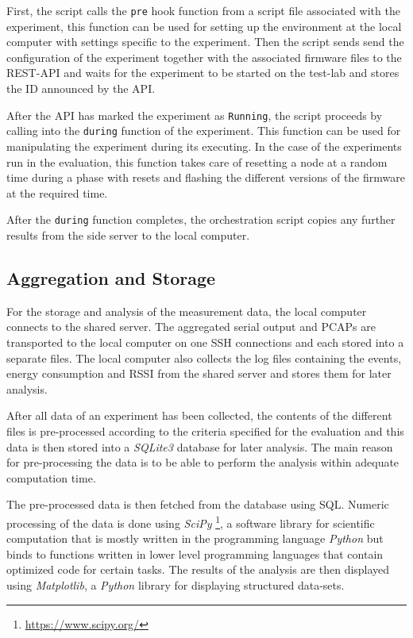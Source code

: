 First, the script calls the \texttt{pre} hook function from a script file
associated with the experiment, this function can be used for setting up the
environment at the local computer with settings specific to the experiment. Then
the script sends send the configuration of the experiment together with the
associated firmware files to the \ac{REST}-\ac{API} and waits for the experiment
to be started on the test-lab and stores the ID announced by the \ac{API}.

After the \ac{API} has marked the experiment as \texttt{Running}, the script
proceeds by calling into the \texttt{during} function of the experiment. This
function can be used for manipulating the experiment during its executing. In
the case of the experiments run in the evaluation, this function takes care of
resetting a node at a random time during a phase with resets and flashing the different versions of the firmware at the
required time.

After the \texttt{during} function completes, the orchestration script copies
any further results from the side server to the local computer.

\subsection{Aggregation and Storage}

For the storage and analysis of the measurement data, the local computer connects
to the shared server. The aggregated serial output and \acp{PCAP} are
transported to the local computer on one \ac{SSH} connections and each stored
into a separate files. The local computer also collects the log files containing
the events, energy consumption and \ac{RSSI} from the shared server and stores them for
later analysis.

After all data of an experiment has been collected, the contents of the
different files is pre-processed according to the criteria specified for the
evaluation and this data is then stored into a
\emph{SQLite3} database for later analysis. The main reason for pre-processing
the data is to be able to perform the analysis within adequate computation time.

The pre-processed data is then fetched from the database using \ac{SQL}. Numeric
processing of the data is done using \emph{SciPy}
\footnote{\url{https://www.scipy.org/}}, a software library for scientific
computation that is mostly written in the programming language \emph{Python}
but binds to functions written in lower level programming languages that contain
optimized code for certain tasks. The results of the analysis are then displayed
using \emph{Matplotlib}, a \emph{Python} library for displaying structured
data-sets.



